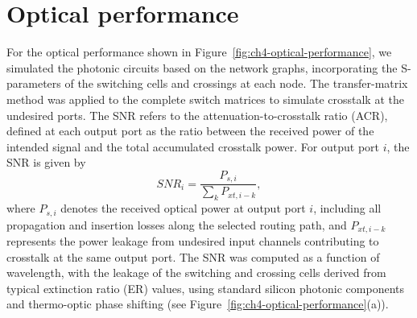 \section{Optical performance}\label{sec:optical_performance} %
For the optical performance shown in Figure~\ref{fig:ch4-optical-performance}, we simulated the photonic circuits based on the network graphs, incorporating the S-parameters of the switching cells and crossings at each node.
The transfer-matrix method \cite{baliliTRANSFERMATRIXMETHOD2012} was applied to the complete switch matrices to simulate crosstalk at the undesired ports.
The SNR refers to the attenuation-to-crosstalk ratio (ACR), defined at each output port as the ratio between the received power of the intended signal and the total accumulated crosstalk power. For output port $i$, the SNR is given by
\begin{equation}
    SNR_i = \frac{P_{s,i}}{\sum_k P_{xt,i-k}},
\end{equation}
where $P_{s,i}$ denotes the received optical power at output port $i$, including all propagation and insertion losses along the selected routing path, and $P_{xt,i-k}$ represents the power leakage from undesired input channels contributing to crosstalk at the same output port.
The SNR was computed as a function of wavelength, with the leakage of the switching and crossing cells derived from typical extinction ratio (ER) values, using standard silicon photonic components and thermo-optic phase shifting \cite{gomez-hidalgoFundamentalBuildingBlocksa} (see Figure~\ref{fig:ch4-optical-performance}(a)).

